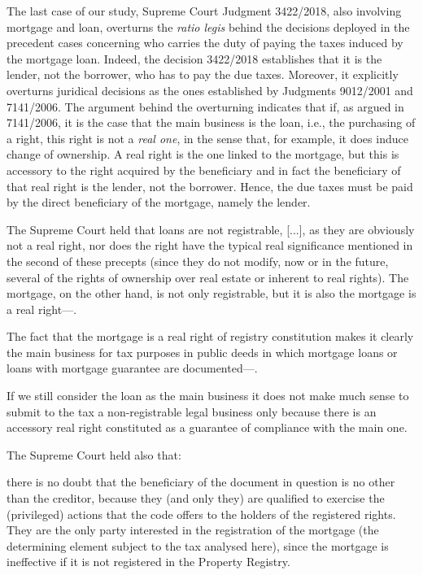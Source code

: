 				The last case of our study, Supreme Court Judgment 3422/2018, also involving mortgage and loan, overturns the \textit{ratio legis} behind the decisions deployed in the precedent cases concerning who carries the duty of paying the taxes induced by the mortgage loan. Indeed, the decision 3422/2018 establishes that it is the lender, not the borrower, who has to pay the due taxes. Moreover, it explicitly overturns juridical decisions as the ones established by Judgments 9012/2001 and 7141/2006. The argument behind the overturning indicates that if, as argued in 7141/2006, it is the case that the main business is the loan, i.e., the purchasing of a right, this right is not a \textit{real one}, in the sense that, for example, it does induce change of ownership. A real right is the one linked to the mortgage, but this is accessory to the right acquired by the beneficiary and in fact the beneficiary of that real right is the lender, not the borrower. Hence, the due taxes must be paid by the direct beneficiary of the mortgage, namely the lender.
				\begin{itquote}
					The Supreme Court held that loans are not registrable, [...], as they are obviously not a real right, nor does the right have the typical real significance mentioned in the second of these precepts (since they do not modify, now or in the future, several of the rights of ownership over real estate or inherent to real rights). The mortgage, on the other hand, is not only registrable, but it is also the mortgage is a real right—.
					
					The fact that the mortgage is a real right of registry constitution makes it clearly the main business for tax purposes in public deeds in which mortgage loans or loans with mortgage guarantee are documented—.
					
					If we still consider the loan as the main business it does not make much sense to submit to the tax a non-registrable legal business only because there is an accessory real right constituted as a guarantee of compliance with the main one.
				\end{itquote} 
				The Supreme Court held also that:
				\begin{itquote}
					[...] there is no doubt that the beneficiary of the document in question is no other than the creditor, because they (and only they) are qualified to exercise the (privileged) actions that the code offers to the holders of the registered rights. They are the only party interested in the registration of the mortgage (the determining element subject to the tax analysed here), since the mortgage is ineffective if it is not registered in the Property Registry. 
				\end{itquote} 
